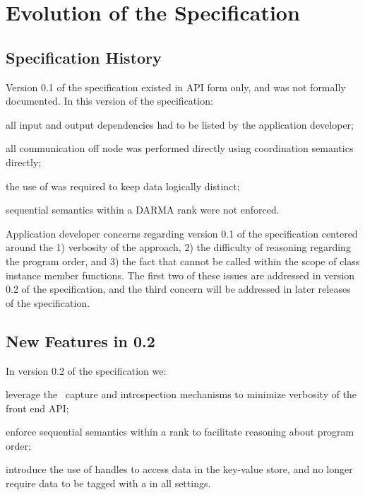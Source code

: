 
\chapter{Evolution of the Specification}
\label{chap:evolution}
\section{Specification History}
\label{sec:past}
Version 0.1 of the specification existed in \gls{API} form only, and was not
formally documented.  In this version of the specification:
\begin{compactenum}
\item all input and output dependencies had to be listed by the application
developer;
\item all communication off node was
performed directly using \gls{coordination semantics} directly;
\item  the use of  was required to keep data
logically distinct;
\item \gls{sequential semantics} within a DARMA rank were not enforced.
\end{compactenum}

 Application developer concerns regarding version 0.1 of the specification
 centered around the 1) verbosity of the approach, 2) the difficulty of
 reasoning regarding the program order, and 3) the fact that 
  cannot be called
 within the scope of class instance member functions.  The first two of these issues are
   addressed in version 0.2 of the specification, and the third concern will be
   addressed in later releases of the specification.
   


\section{New Features in 0.2}
\label{sec:current}
In version 0.2 of the specification we:
  \begin{compactenum}
\item leverage the \CC\ \gls{capture} and
    \gls{introspection} mechanisms to minimize verbosity of the \gls{front end}
    \gls{API};  
\item enforce \gls{sequential semantics} within a \gls{rank} to
    facilitate reasoning about program order; 
\item introduce the use of
    \glspl{handle} to access data in the \gls{key-value store}, and no longer
    require data to be tagged with a  in all
    settings.
    \end{compactenum}


